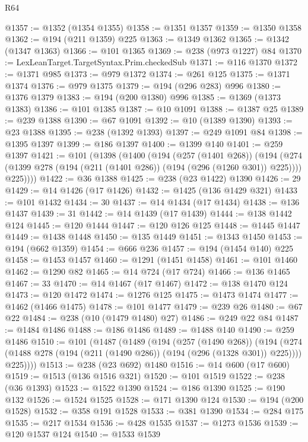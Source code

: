\begin{lexlean}{R64}
\begin{coremodule}
@1357 := @1352 (@1354 @1355)
@1358 := @1351 @1357
@1359 := @1350 @1358
@1362 := @194 (@211 @1359) @225
@1363 := @1349 @1362
@1365 := @1342 (@1347 @1363)
@1366 := @101 @1365
@1369 := @238 (@973 @1227) @84
@1370 := LexLeanTarget.TargetSyntax.Prim.checkedSub
@1371 := @116 @1370
@1372 := @1371 @985
@1373 := @979 @1372
@1374 := @261 @125
@1375 := @1371 @1374
@1376 := @979 @1375
@1379 := @194 (@296 @283) @996
@1380 := @1376 @1379
@1383 := @194 (@200 @1380) @996
@1385 := @1369 (@1373 @1383)
@1386 := @101 @1385
@1387 := @10 @1091
@1388 := @1387 @25
@1389 := @239 @1388
@1390 := @67 @1091
@1392 := @10 (@1389 @1390)
@1393 := @23 @1388
@1395 := @238 (@1392 @1393)
@1397 := @249 @1091 @84
@1398 := @1395 @1397
@1399 := @186 @1397
@1400 := @1399 @140
@1401 := @259 @1397
@1421 := @101
    (@1398
      (@1400
        (@194
          (@257 (@1401 @268))
          (@194
            (@274 (@1399 @278 (@194 (@211 (@1401 @286)) (@194 (@296 (@1260 @301)) @225))))
            @225))))
@1422 := @36 @1388
@1425 := @238 (@23 @1422) @1390
@1426 := 29
@1429 := @14 @1426 (@17 @1426)
@1432 := @1425 (@136 @1429 @321)
@1433 := @101 @1432
@1434 := 30
@1437 := @14 @1434 (@17 @1434)
@1438 := @136 @1437
@1439 := 31
@1442 := @14 @1439 (@17 @1439)
@1444 := @138 @1442 @124
@1445 := @120 @1444
@1447 := @120 @126 @125
@1448 := @1445 @1447
@1449 := @1438 @1448
@1450 := @135 @1449
@1451 := @1343 @1450
@1453 := @194 (@662 @1359)
@1454 := @666 @236
@1457 := @194 (@1454 @140) @225
@1458 := @1453 @1457
@1460 := @1291 (@1451 @1458)
@1461 := @101 @1460
@1462 := @1290 @82
@1465 := @14 @724 (@17 @724)
@1466 := @136 @1465
@1467 := 33
@1470 := @14 @1467 (@17 @1467)
@1472 := @138 @1470 @124
@1473 := @120 @1472
@1474 := @1276 @125
@1475 := @1473 @1474
@1477 := @1462 (@1466 @1475)
@1478 := @101 @1477
@1479 := @239 @26
@1480 := @67 @22
@1484 := @238 (@10 (@1479 @1480) @27)
@1486 := @249 @22 @84
@1487 := @1484 @1486
@1488 := @186 @1486
@1489 := @1488 @140
@1490 := @259 @1486
@1510 := @101
    (@1487
      (@1489
        (@194
          (@257 (@1490 @268))
          (@194
            (@274 (@1488 @278 (@194 (@211 (@1490 @286)) (@194 (@296 (@1328 @301)) @225))))
            @225))))
@1513 := @238 (@23 @692) @1480
@1516 := @14 @600 (@17 @600)
@1519 := @1513 (@136 @1516 @321)
@1520 := @101 @1519
@1522 := @238 (@36 @1393)
@1523 := @1522 @1390
@1524 := @186 @1390
@1525 := @190 @132
@1526 := @1524 @1525
@1528 := @171 @1390 @124
@1530 := @194 (@200 @1528)
@1532 := @358 @191 @1528
@1533 := @381 @1390
@1534 := @284 @175
@1535 := @217 @1534
@1536 := @428 @1535
@1537 := @1273 @1536
@1539 := @120 @1537 @124
@1540 := @1533 @1539

\end{coremodule}
\end{lexlean}
